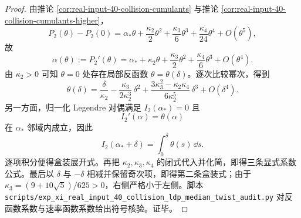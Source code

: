 \begin{proof}
由推论 \ref{cor:real-input-40-collision-cumulants} 与推论 \ref{cor:real-input-40-collision-cumulants-higher}，
\[
P_2(\theta)-P_2(0)
=
\alpha_*\theta+\frac{\kappa_2}{2}\theta^2+\frac{\kappa_3}{6}\theta^3+\frac{\kappa_4}{24}\theta^4+O(\theta^5),
\]
故
\[
\alpha(\theta):=P_2'(\theta)
=
\alpha_*+\kappa_2\theta+\frac{\kappa_3}{2}\theta^2+\frac{\kappa_4}{6}\theta^3+O(\theta^4).
\]
由 \(\kappa_2>0\) 可知 \(\theta=0\) 处存在局部反函数 \(\theta=\theta(\delta)\)。逐次比较幂次，得到
\[
\theta(\delta)
=
\frac{\delta}{\kappa_2}
-\frac{\kappa_3}{2\kappa_2^3}\,\delta^2
+\frac{3\kappa_3^2-\kappa_2\kappa_4}{6\kappa_2^5}\,\delta^3
+O(\delta^4).
\]
另一方面，归一化 Legendre 对偶满足 \(I_2(\alpha_*)=0\) 且
\[
I_2'(\alpha)=\theta(\alpha)
\]
在 \(\alpha_*\) 邻域内成立，因此
\[
I_2(\alpha_*+\delta)=\int_0^\delta \theta(s)\,\dd s.
\]
逐项积分便得盒装展开式。再把 \(\kappa_2,\kappa_3,\kappa_4\) 的闭式代入并化简，即得三条显式系数公式。最后以 \(\delta\) 与 \(-\delta\) 相减并保留奇次项，即得第二条盒装式；由于 \(\kappa_3=(9+10\sqrt5)/625>0\)，右侧严格小于左侧。脚本 \texttt{scripts/exp\_xi\_real\_input\_40\_collision\_ldp\_median\_twist\_audit.py} 对反函数系数与速率函数系数给出符号核验。证毕。
\end{proof}

